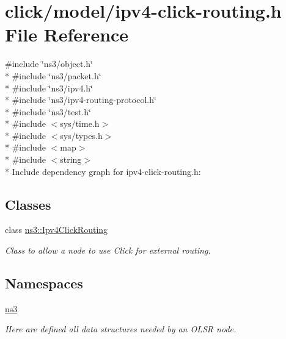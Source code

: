 \hypertarget{ipv4-click-routing_8h}{}\section{click/model/ipv4-\/click-\/routing.h File Reference}
\label{ipv4-click-routing_8h}
{\ttfamily \#include \char`\"{}ns3/object.\+h\char`\"{}}\\*
{\ttfamily \#include \char`\"{}ns3/packet.\+h\char`\"{}}\\*
{\ttfamily \#include \char`\"{}ns3/ipv4.\+h\char`\"{}}\\*
{\ttfamily \#include \char`\"{}ns3/ipv4-\/routing-\/protocol.\+h\char`\"{}}\\*
{\ttfamily \#include \char`\"{}ns3/test.\+h\char`\"{}}\\*
{\ttfamily \#include $<$sys/time.\+h$>$}\\*
{\ttfamily \#include $<$sys/types.\+h$>$}\\*
{\ttfamily \#include $<$map$>$}\\*
{\ttfamily \#include $<$string$>$}\\*
Include dependency graph for ipv4-\/click-\/routing.h\+:
\subsection*{Classes}
\begin{DoxyCompactItemize}
\item 
class \hyperlink{classns3_1_1Ipv4ClickRouting}{ns3\+::\+Ipv4\+Click\+Routing}
\begin{DoxyCompactList}\small\item\em Class to allow a node to use Click for external routing. \end{DoxyCompactList}\end{DoxyCompactItemize}
\subsection*{Namespaces}
\begin{DoxyCompactItemize}
\item 
 \hyperlink{namespacens3}{ns3}
\begin{DoxyCompactList}\small\item\em Here are defined all data structures needed by an O\+L\+SR node. \end{DoxyCompactList}\end{DoxyCompactItemize}

